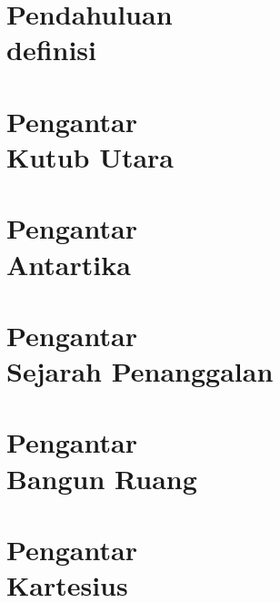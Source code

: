 \documentclass{WileySix}
\begin{document}
%



\chapter[Pendahuluan]
{Pendahuluan\\ definisi}


\chapter[Sejarah Kutub Utara]
{Pengantar\\ Kutub Utara}


\chapter[Tentang Kutub Selatan]
{Pengantar\\ Antartika}


%

\chapter[Sejarah Penanggalan]
{Pengantar\\ Sejarah  Penanggalan}




\chapter[Bangun Ruang]
{Pengantar\\ Bangun Ruang}


\chapter[Diagram Kartesius]
{Pengantar\\ Kartesius}

\end{document}
